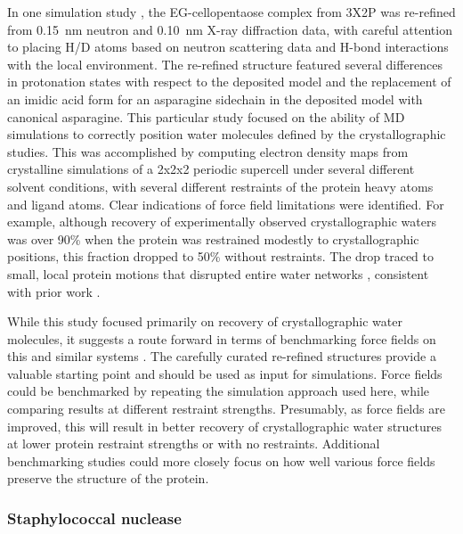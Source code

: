 \documentclass[9pt,review]{livecoms}
\begin{document}
In one simulation study \cite{wall_biomolecular_2019}, the EG-cellopentaose complex from 3X2P was re-refined from \qty{0.15}{\nano\meter} neutron and \qty{0.10}{\nano\meter} X-ray diffraction data, with careful attention to placing H/D atoms based on neutron scattering data and H-bond interactions with the local environment.
The re-refined structure featured several differences in protonation states with respect to the deposited model and the replacement of an imidic acid form for an asparagine sidechain in the deposited model with canonical asparagine.
This particular study focused on the ability of MD simulations to correctly position water molecules defined by the crystallographic studies.
This was accomplished by computing electron density maps from crystalline simulations of a 2x2x2 periodic supercell under several different solvent conditions, with several different restraints of the protein heavy atoms and ligand atoms.
Clear indications of force field limitations were identified.
For example, although recovery of experimentally observed crystallographic waters was over 90\% when the protein was restrained modestly to crystallographic positions, this fraction dropped to 50\% without restraints.
The drop traced to small, local protein motions that disrupted entire water networks \cite{wall_biomolecular_2019}, consistent with prior work \cite{lexa_full_2011}.

While this study focused primarily on recovery of crystallographic water molecules, it suggests a route forward in terms of benchmarking force fields on this and similar systems \cite{wall_biomolecular_2019}.
The carefully curated re-refined structures provide a valuable starting point and should be used as input for simulations.
Force fields could be benchmarked by repeating the simulation approach used here, while comparing results at different restraint strengths.
Presumably, as force fields are improved, this will result in better recovery of crystallographic water structures at lower protein restraint strengths or with no restraints.
Additional benchmarking studies could more closely focus on how well various force fields preserve the structure of the protein.

\subsubsection{Staphylococcal nuclease}
\label{sub2:staph_nuclease}
\end{document}
